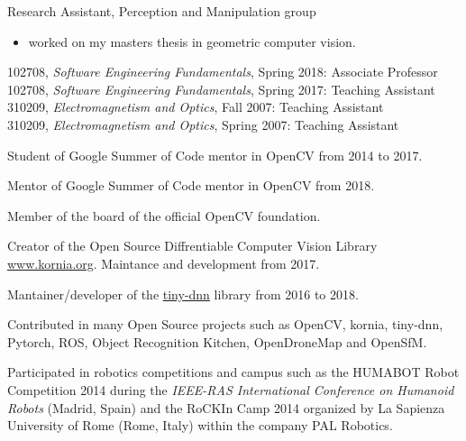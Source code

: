 \documentclass{article}
\begin{document}
\begin{llist}
Research Assistant, Perception and Manipulation group
\vspace{-0.33cm}
\begin{itemize}
 \item worked on my masters thesis in geometric computer vision.
\end{itemize}


\label{Teaching Experience}

102708, {\em Software Engineering Fundamentals}, Spring 2018: Associate Professor\\

102708, {\em Software Engineering Fundamentals}, Spring 2017: Teaching Assistant\\

310209, {\em Electromagnetism and Optics}, Fall 2007: Teaching Assistant\\
310209, {\em Electromagnetism and Optics}, Spring 2007: Teaching Assistant

\vspace{-0.4cm}

Student of Google Summer of Code mentor in OpenCV from 2014 to 2017.

Mentor of Google Summer of Code mentor in OpenCV from 2018.

Member of the board of the official OpenCV foundation.

Creator of the Open Source Diffrentiable Computer Vision Library \href{www.kornia.org}{www.kornia.org}. Maintance and development from 2017.

Mantainer/developer of the \href{http://tiny-dnn.readthedocs.io}{tiny-dnn} library from 2016 to 2018.

Contributed in many Open Source projects such as OpenCV, kornia, tiny-dnn, Pytorch, ROS, Object Recognition Kitchen, OpenDroneMap and OpenSfM.

Participated in robotics competitions and campus such as the HUMABOT Robot Competition 2014 during the \textit{IEEE-RAS International Conference on Humanoid Robots} (Madrid, Spain) and the RoCKIn Camp 2014 organized by  La Sapienza University of Rome (Rome, Italy) within the company PAL Robotics.


\end{llist}
\end{document}

